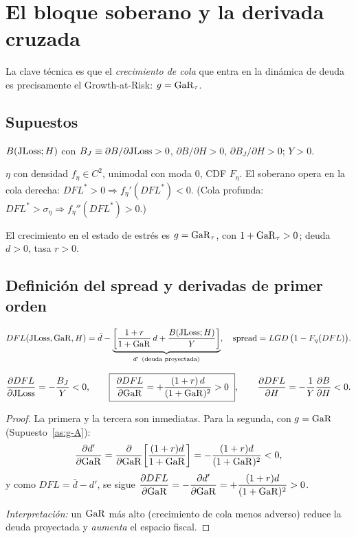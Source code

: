 \section{El bloque soberano y la derivada cruzada}\label{sec:soberano-A}

La clave técnica es que el \emph{crecimiento de cola} que entra en la dinámica de deuda es precisamente el Growth-at-Risk: $g=\mathrm{GaR}_\tau$.

\subsection{Supuestos}
\begin{assumption}\label{as:B-A}
$B(\mathrm{JLoss};H)$ con $B_J\equiv\partial B/\partial\mathrm{JLoss}>0$, $\partial B/\partial H>0$, $\partial B_J/\partial H>0$; $Y>0$.
\end{assumption}
\begin{assumption}\label{as:eta-A}
$\eta$ con densidad $f_\eta\in C^2$, unimodal con moda $0$, CDF $F_\eta$. El soberano opera en la cola derecha: $DFL^*>0\Rightarrow f_\eta'(DFL^*)<0$. (Cola profunda: $DFL^*>\sigma_\eta\Rightarrow f_\eta''(DFL^*)>0$.)
\end{assumption}
\begin{assumption}\label{as:g-A}
El crecimiento en el estado de estrés es $g=\mathrm{GaR}_\tau$, con $1+\mathrm{GaR}_\tau>0$; deuda $d>0$, tasa $r>0$.
\end{assumption}

\subsection{Definición del spread y derivadas de primer orden}
\begin{equation}
DFL(\JLoss,\GaR,H)=\bar d-\underbrace{\left[\frac{1+r}{1+\GaR}\,d+\frac{B(\JLoss;H)}{Y}\right]}_{d'\ (\text{deuda proyectada})},\quad
\Spread=LGD\,\big(1-F_\eta(DFL)\big).
\label{eq:embi}
\end{equation}

\begin{lemma}\label{lem:dfl-A}
\[
\frac{\partial DFL}{\partial \mathrm{JLoss}}=-\frac{B_J}{Y}<0,\qquad
\boxed{\ \frac{\partial DFL}{\partial \mathrm{GaR}}=+\frac{(1+r)\,d}{(1+\mathrm{GaR})^2}>0\ },\qquad
\frac{\partial DFL}{\partial H}=-\frac{1}{Y}\frac{\partial B}{\partial H}<0.
\]
\end{lemma}
\begin{proof}
La primera y la tercera son inmediatas. Para la segunda, con $g=\mathrm{GaR}$ (Supuesto~\ref{as:g-A}):
\[
\frac{\partial d'}{\partial \mathrm{GaR}}=\frac{\partial}{\partial \mathrm{GaR}}\!\left[\frac{(1+r)d}{1+\mathrm{GaR}}\right]=-\frac{(1+r)d}{(1+\mathrm{GaR})^2}<0,
\]
y como $DFL=\bar d-d'$, se sigue $\dfrac{\partial DFL}{\partial\mathrm{GaR}}=-\dfrac{\partial d'}{\partial\mathrm{GaR}}=+\dfrac{(1+r)d}{(1+\mathrm{GaR})^2}>0$.

\noindent\emph{Interpretación:} un $\mathrm{GaR}$ más alto (crecimiento de cola menos adverso) reduce la deuda proyectada y \emph{aumenta} el espacio fiscal.
\end{proof}

